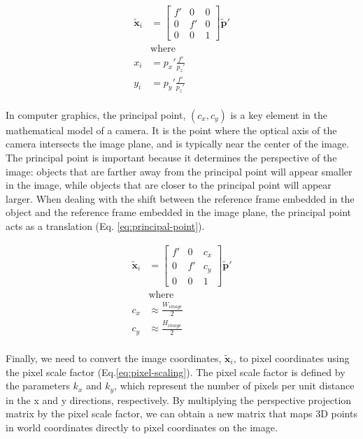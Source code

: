 \begin{equation}
    \begin{aligned}
        \tilde{\mathbf{x}}_{i} &= \begin{bmatrix}
            f' & 0 & 0 \\ 0 & f' & 0 \\ 0 & 0 & 1 
        \end{bmatrix} \tilde{\mathbf{p}}' \\
        &\text{where} \\
        x_i &= p_x'\frac{f'}{p_z'} \\
        y_i &= p_y'\frac{f'}{p_z'} \\
    \end{aligned}
    \label{eq:perspective-projection}
\end{equation}

In computer graphics, the principal point, $(c_x,c_y)$ is a key element in the mathematical model of a camera. It is the point where the optical axis of the camera intersects the image plane, and is typically near the center of the image. The principal point is important because it determines the perspective of the image: objects that are farther away from the principal point will appear smaller in the image, while objects that are closer to the principal point will appear larger. When dealing with the shift between the reference frame embedded in the object and the reference frame embedded in the image plane, the principal point acts as a translation (Eq. \ref{eq:principal-point}).


\begin{equation}
    \begin{aligned}
        \tilde{\mathbf{x}}_{i} &= \begin{bmatrix}
            f' & 0 & c_x \\ 0 & f' & c_y \\ 0 & 0 & 1 
        \end{bmatrix} \tilde{\mathbf{p}}' \\
        &\text{where} \\
        c_x &\approx \frac{W_{image}}{2} \\
        c_y &\approx \frac{H_{image}}{2} \\
    \end{aligned}
    \label{eq:principal-point}
\end{equation}

Finally, we need to convert the image coordinates, $\tilde{\mathbf{x}}_i$, to pixel coordinates using the pixel scale factor (Eq.\ref{eq:pixel-scaling}). The pixel scale factor is defined by the parameters $k_x$ and $k_y$, which represent the number of pixels per unit distance in the x and y directions, respectively. By multiplying the perspective projection matrix by the pixel scale factor, we can obtain a new matrix that maps 3D points in world coordinates directly to pixel coordinates on the image.

